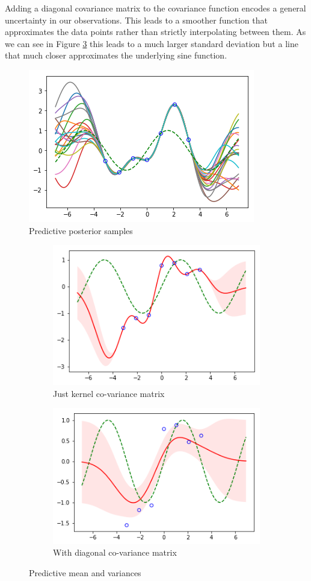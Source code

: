 \documentclass{article}
\begin{document}
Adding a diagonal covariance matrix to the covariance function encodes a general uncertainty in our observations. This leads to a smoother function that approximates the data points rather than strictly interpolating between them. As we can see in Figure \ref{fig:variancewithdiag} this leads to a much larger standard deviation but a line that much closer approximates the underlying sine function.
\begin{figure}[H]
	\centering
	\includegraphics[width=0.4\linewidth]{samples}
	\caption{Predictive posterior samples}
	\label{fig:samples}
\end{figure}
\begin{figure}[H]
	\centering
	\begin{subfigure}[t]{0.4\linewidth}
		\includegraphics[width=\linewidth]{variance}
		\caption{Just kernel co-variance matrix}
		\label{fig:variance}
	\end{subfigure}
	\begin{subfigure}[t]{0.4\linewidth}
		\includegraphics[width=\linewidth]{variancewithdiag}
		\caption{With diagonal co-variance matrix}
		\label{fig:variancewithdiag}
	\end{subfigure}
	\caption{Predictive mean and variances}
	\label{fig:muandcov}
\end{figure}
\end{document}
